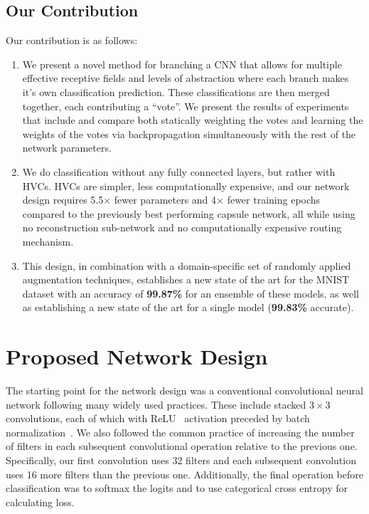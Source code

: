 \documentclass{article}
\begin{document}
\subsection{Our Contribution}
Our contribution is as follows:
\begin{enumerate}
  \item We present a novel method for branching a CNN that allows for multiple effective receptive fields and levels of abstraction where each branch makes it's own classification prediction.  These classifications are then merged together, each contributing a ``vote''.  We present the results of experiments that include and compare both statically weighting the votes and learning the weights of the votes via backpropagation simultaneously with the rest of the network parameters.
  \item We do classification without any fully connected layers, but rather with HVCs.  HVCs are simpler, less computationally expensive, and our network design requires 5.5\(\times{}\) fewer parameters and 4\(\times{}\) fewer training epochs compared to the previously best performing capsule network, all while using no reconstruction sub-network and no computationally expensive routing mechanism.\@
  \item  This design, in combination with a domain-specific set of randomly applied augmentation techniques, establishes a new state of the art for the MNIST dataset with an accuracy of \textbf{99.87\%} for an ensemble of these models, as well as establishing a new state of the art for a single model (\textbf{99.83\%} accurate).
\end{enumerate}

\section{Proposed Network Design}\label{sec:proposed_network_design}

The starting point for the network design was a conventional convolutional neural network following many widely used practices.  These include stacked \(3\times3\) convolutions, each of which with ReLU~\cite{Glorot2011} activation preceded by batch normalization~\cite{Ioffe2015}.  We also followed the common practice of increasing the number of filters in each subsequent convolutional operation relative to the previous one.  Specifically, our first convolution uses 32 filters and each subsequent convolution uses 16 more filters than the previous one.  Additionally, the final operation before classification was to softmax the logits and to use categorical cross entropy for calculating loss.
\end{document}
